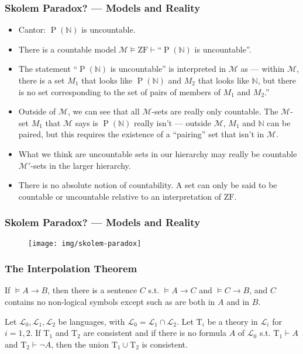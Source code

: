 \documentclass[UTF8,aspectratio=43,11pt,colorlinks,compress,openany]{beamer}%
\begin{document}
\begin{frame}\frametitle{Skolem Paradox? --- Models and Reality}
	\begin{itemize}
		\item Cantor: $\operatorname{P}(\mathbb{N})$ is uncountable.
		\item There is a countable model $\mathcal{M}\vDash \mathrm{ZF}\vdash$``$\operatorname{P}(\mathbb{N})$ is uncountable''.
		\item The statement ``$\operatorname{P}(\mathbb{N})$ is uncountable'' is interpreted in $\mathcal{M}$ as --- within $\mathcal{M}$, there is a set $M_1$ that looks like $\operatorname{P}(\mathbb{N})$ and $M_2$ that looks like $\mathbb{N}$, but there is no set corresponding to the set of pairs of members of $M_1$ and $M_2$.''
		\item Outside of $\mathcal{M}$, we can see that all $\mathcal{M}$-sets are really only countable. The $\mathcal{M}$-set $M_1$ that $\mathcal{M}$ says is $\operatorname{P}(\mathbb{N})$ really isn't --- outside $\mathcal{M}$, $M_1$ and $\mathbb{N}$ can be paired, but this requires the existence of a ``pairing'' set that isn't in $\mathcal{M}$.
		\item What we think are uncountable sets in our hierarchy may really be countable $\mathcal{M}'$-sets in the larger hierarchy.
		\item There is no absolute notion of countability. A set can only be said to be countable or uncountable relative to an interpretation of $\mathrm{ZF}$.
	\end{itemize}
\end{frame}

\begin{frame}\frametitle{Skolem Paradox? --- Models and Reality}
	\begin{figure}
		\texttt{[image: img/skolem-paradox]}
	\end{figure}
\end{frame}

\begin{frame}\frametitle{The Interpolation Theorem}
	\begin{theorem}
		If $\vDash A\to B$, then there is a
		sentence $C$ s.t. $\vDash A\to C$ and $\vDash C\to B$, and $C$ contains no non-logical symbols except such as are both in $A$ and in $B$.
	\end{theorem}
	\begin{theorem}
		Let $\mathscr{L}_0,\mathscr{L}_1,\mathscr{L}_2$ be languages, with $\mathscr{L}_0=\mathscr{L}_1\cap \mathscr{L}_2$. Let $\mathrm{T}_i$ be a theory in $\mathscr{L}_i$ for $i=1,2$. If $\mathrm{T}_1$ and $\mathrm{T}_2$ are consistent and if there is no formula $A$ of $\mathscr{L}_0$ s.t. $\mathrm{T}_1\vdash A$ and $\mathrm{T}_2\vdash\neg A$, then the union $\mathrm{T}_1\cup \mathrm{T}_2$ is consistent.
	\end{theorem}
\end{frame}
\end{document}

